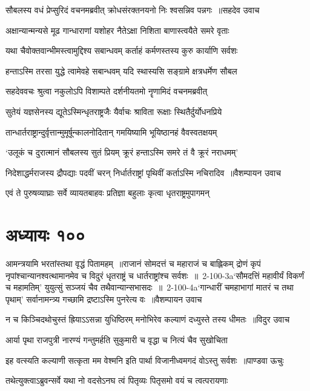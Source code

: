 \twolineshloka
{सौबलस्य वधं प्रेप्सुरिदं वचनमब्रवीत्}
{क्रोधसंरक्तनयनो निः श्वसन्निव पन्नगः ॥सहदेव उवाच}


\twolineshloka
{अक्षान्यान्मन्यसे मूढ गान्धाराणां यशोहर}
{नैतेऽक्षा निशिता बाणास्त्वयैते समरे वृताः}


\twolineshloka
{यथा चैवोक्तवान्भीमस्त्वामुद्दिश्य सबान्धवम्}
{कर्ताहं कर्मणस्तस्य कुरु कार्याणि सर्वशः}


\twolineshloka
{हन्ताऽस्मि तरसा युद्धे त्वामेवहे सबान्धवम्}
{यदि स्थास्यसि सङ्ग्रामे क्षत्रधर्मेण सौबल}


\twolineshloka
{सहदेववचः श्रुत्वा नकुलोऽपि विशाम्पते}
{दर्शनीयतमो नॄणामिदं वचनमब्रवीत्}


\twolineshloka
{सुतेयं यज्ञसेनस्य द्यूतेऽस्मिन्धृतराष्ट्रजैः}
{यैर्वाचः श्राविता रूक्षाः स्थितैर्दुर्योधनप्रिये}


\twolineshloka
{तान्धार्तराष्ट्रान्दुर्वृत्तान्मुमूर्षून्कालनोदितान्}
{गमयिष्यामि भूयिष्ठानहं वैवस्वतक्षयम्}


\twolineshloka
{`उलूकं च दुरात्मानं सौबलस्य सुतं प्रियम्}
{क्रूरं हन्ताऽस्मि समरे तं वै क्रूरं नराधमम्'}


\twolineshloka
{निदेशाद्धर्मराजस्य द्रौपद्याः पदवीं चरन्}
{निर्धार्तराष्ट्रां पृथिवीं कर्ताऽस्मि नचिरादिव ॥वैशम्पायन उवाच}


\twolineshloka
{एवं ते पुरुषव्याघ्राः सर्वे व्यायतबाहवः}
{प्रतिज्ञा बहुलाः कृत्वा धृतराष्ट्रमुपागमन्}


\chapter{अध्यायः १००}
आमन्त्रयामि भरतांस्तथा वृद्धं पितामहम् ॥राजानं सोमदत्तं च महाराजं च बाह्लिकम्
\fourlineindentedshloka
{द्रोणं कृपं नृपांश्चान्यानश्वत्थामानमेव च}
{विदुरं धृतराष्ट्रं च धार्तराष्ट्रांश्च सर्वशः ॥ 2-100-3a`सौमदत्तिं महावीर्यं विकर्णं च महामतिम्'}
{युयुत्सुं सञ्जयं चैव तथैवान्यान्सभासदः ॥ 2-100-4a`गान्धारीं चमहाभागां मातरं च तथा पृथाम्'}
{सर्वानामन्त्र्य गच्छामि द्रष्टाऽस्मि पुनरेत्य वः ॥वैशम्पायन उवाच}


\twolineshloka
{न च किञ्चिदथोचुस्तं ह्रियाऽऽसन्ना युधिष्ठिरम्}
{मनोभिरेव कल्याणं दध्युस्ते तस्य धीमतः ॥विदुर उवाच}


\twolineshloka
{आर्या पृथा राजपुत्री नारण्यं गन्तुमर्हति}
{सुकुमारी च वृद्धा च नित्यं चैव सुखोचिता}


\threelineshloka
{इह वत्स्यति कल्याणी सत्कृता मम वेश्मनि}
{इति पार्था विजानीध्वमगदं वोऽस्तु सर्वशः ॥पाण्डवा ऊचुः}
{}


\twolineshloka
{तथेत्युक्त्वाऽब्रुवन्सर्वे यथा नो वदसेऽनघ}
{त्वं पितृव्यः पितृसमो वयं च त्वत्परायणाः}


